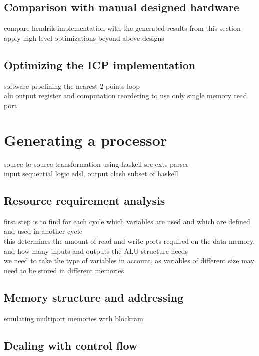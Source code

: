 \documentclass[preprint]{sigplanconf}
\def\codefamily{\sffamily\normalsize}
\begin{document}
\lstset{basicstyle=\codefamily}

\subsection{Comparison with manual designed hardware}
compare hendrik implementation with the generated results from this section \\
apply high level optimizations beyond above designs

\subsection{Optimizing the ICP implementation}
software pipelining the nearest 2 points loop \\
alu output register and computation reordering to use only single memory read port

\section{Generating a processor}
source to source transformation using haskell-src-exts parser\\
input sequential logic edsl, output clash subset of haskell

\subsection{Resource requirement analysis}

first step is to find for each cycle which variables are used and which are defined and used in another cycle \\
this determines the amount of read and write ports required on the data memory, and how many inputs and outputs the ALU structure needs \\
we need to take the type of variables in account, as variables of different size may need to be stored in different memories

\subsection{Memory structure and addressing}

emulating multiport memories with blockram

\subsection{Dealing with control flow}
\end{document}
